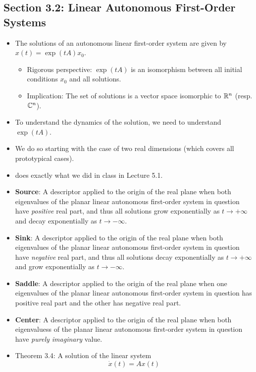 \documentclass[../notes.tex]{subfiles}
\begin{document}
\subsection*{Section 3.2: Linear Autonomous First-Order Systems}
\begin{itemize}
    \item {}The solutions of an autonomous linear first-order system are given by $x(t)=\exp(tA)x_0$.
    \begin{itemize}
        \item Rigorous perspective: $\exp(tA)$ is an isomorphism between all initial conditions $x_0$ and all solutions.
        \item Implication: The set of solutions is a vector space isomorphic to $\mathbb{R}^n$ (resp. $\mathbb{C}^n$).
    \end{itemize}
    \item To understand the dynamics of the solution, we need to understand $\exp(tA)$.
    \item We do so starting with the case of two real dimensions (which covers all prototypical cases).
    \item \textcite{bib:Teschl} does exactly what we did in class in Lecture 5.1.
    \item \textbf{Source}: A descriptor applied to the origin of the real plane when both eigenvalues of the planar linear autonomous first-order system in question have \emph{positive} real part, and thus all solutions grow exponentially as $t\to +\infty$ and decay exponentially as $t\to -\infty$.
    \item \textbf{Sink}: A descriptor applied to the origin of the real plane when both eigenvalues of the planar linear autonomous first-order system in question have \emph{negative} real part, and thus all solutions decay exponentially as $t\to +\infty$ and grow exponentially as $t\to -\infty$.
    \item \textbf{Saddle}: A descriptor applied to the origin of the real plane when one eigenvalues of the planar linear autonomous first-order system in question has positive real part and the other has negative real part.
    \item \textbf{Center}: A descriptor applied to the origin of the real plane when both eigenvaluess of the planar linear autonomous first-order system in question have \emph{purely imaginary} value.
    \item Theorem 3.4: A solution of the linear system
    \begin{equation*}
        \dot{x}(t) = Ax(t)

\end{equation*}
\end{itemize}
\end{document}
